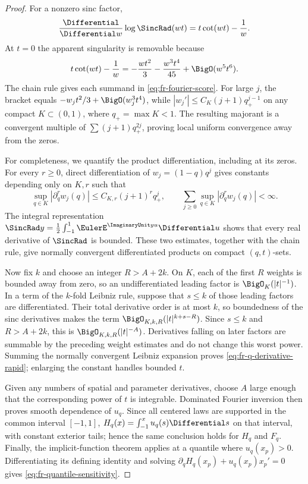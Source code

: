 \begin{proof}
For a nonzero sinc factor,
\[
 \frac{\Differential}{\Differential w}\log\SincRad(wt)=t\cot(wt)-\frac1w.
\]
At \(t=0\) the apparent singularity is removable because
\[
 t\cot(wt)-\frac1w=-\frac{wt^2}{3}-\frac{w^3t^4}{45}
 +\BigO(w^5t^6).
\]
The chain rule gives each summand in \cref{eq:fr-fourier-score}.  For large
\(j\), the bracket equals
\(-w_jt^2/3+\BigO(w_j^3t^4)\), while
\(|w_j'|\le C_K(j+1)q_+^{j-1}\) on any compact \(K\subset(0,1)\), where
\(q_+=\max K<1\).  The resulting majorant is a convergent multiple of
\(\sum(j+1)q_+^{2j}\), proving local uniform convergence away from the zeros.

For completeness, we quantify the product differentiation, including at its
zeros.  For every \(r\ge0\), direct differentiation of
\(w_j=(1-q)q^j\) gives constants depending only on \(K,r\) such that
\[
 \sup_{q\in K}|\partial_q^r w_j(q)|
 \le C_{K,r}(j+1)^r q_+^j,
 \qquad
 \sum_{j\ge0}\sup_{q\in K}|\partial_q^r w_j(q)|<\infty.
\]
The integral representation
\(\SincRad y=\frac12\int_{-1}^{1}\EulerE^{\ImaginaryUnit yu}\Differential u\) shows that every real
derivative of \(\SincRad\) is bounded.  These two estimates, together with the
chain rule, give normally convergent differentiated products on compact
\((q,t)\)-sets.

Now fix \(k\) and choose an integer \(R>A+2k\).  On \(K\), each of the first
\(R\) weights is bounded away from zero, so an undifferentiated leading factor
is \(\BigO_K(|t|^{-1})\).  In a term of the \(k\)-fold Leibniz rule, suppose
that \(s\le k\) of those leading factors are differentiated.  Their total
derivative order is at most \(k\), so boundedness of the sinc derivatives
makes the term \(\BigO_{K,k,R}(|t|^{k+s-R})\).  Since \(s\le k\) and
\(R>A+2k\), this is \(\BigO_{K,k,R}(|t|^{-A})\).
Derivatives falling on later factors are summable by the preceding weight
estimates and do not change this worst power.  Summing the normally convergent
Leibniz expansion proves \cref{eq:fr-q-derivative-rapid}; enlarging the
constant handles bounded \(t\).

Given any numbers of spatial and parameter derivatives, choose \(A\) large
enough that the corresponding power of \(t\) is integrable.  Dominated Fourier
inversion then proves smooth dependence of \(u_q\).  Since all centered laws
are supported in the common interval \([-1,1]\),
\(H_q(x)=\int_{-1}^xu_q(s)\Differential s\) on that interval, with constant exterior
tails; hence the same conclusion holds for \(H_q\) and \(F_q\).  Finally, the
implicit-function theorem applies at a quantile where \(u_q(x_p)>0\).
Differentiating its defining identity and solving
\(\partial_qH_q(x_p)+u_q(x_p)x_p'=0\) gives
\cref{eq:fr-quantile-sensitivity}.
\end{proof}

